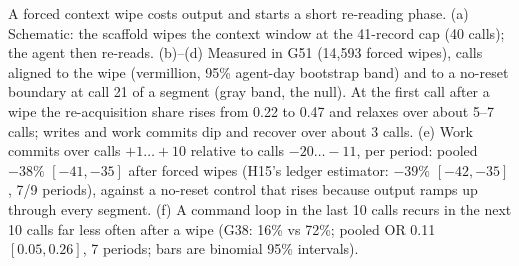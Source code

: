 \caption{A forced context wipe costs output and starts a short re-reading phase.
(a) Schematic: the scaffold wipes the context window at the 41-record cap (40 calls); the agent then re-reads.
(b)--(d) Measured in G51 (14{,}593 forced wipes), calls aligned to the wipe (vermillion, 95\% agent-day bootstrap band) and to a no-reset boundary at call 21 of a segment (gray band, the null).
At the first call after a wipe the re-acquisition share rises from 0.22 to 0.47 and relaxes over about 5--7 calls; writes and work commits dip and recover over about 3 calls.
(e) Work commits over calls $+1\ldots+10$ relative to calls $-20\ldots-11$, per period: pooled $-38\%$ $[-41,-35]$ after forced wipes (H15's ledger estimator: $-39\%$ $[-42,-35]$, 7/9 periods), against a no-reset control that rises because output ramps up through every segment.
(f) A command loop in the last 10 calls recurs in the next 10 calls far less often after a wipe (G38: 16\% vs 72\%; pooled OR 0.11 $[0.05, 0.26]$, 7 periods; bars are binomial 95\% intervals).}
\label{fig:H44}
